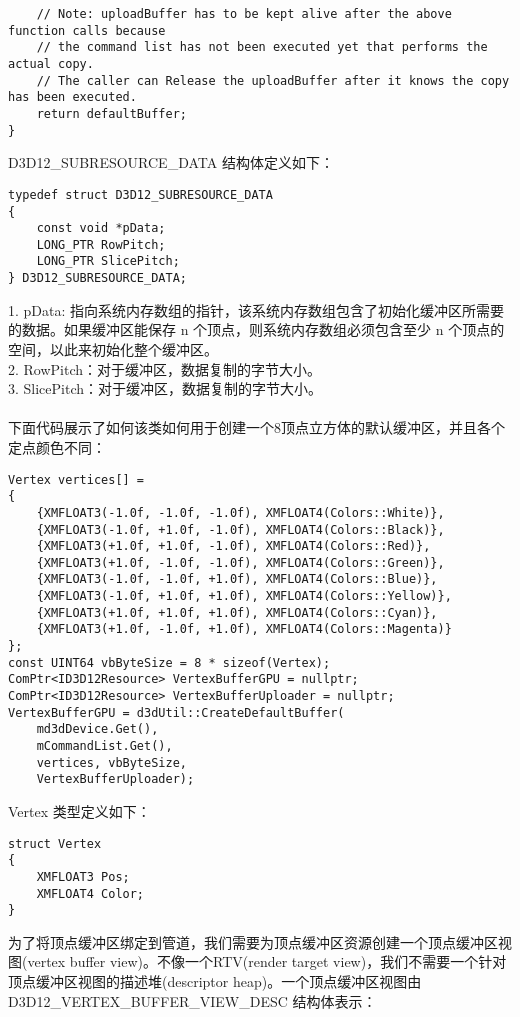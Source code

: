 \begin{flushleft}
\begin{lstlisting}
    // Note: uploadBuffer has to be kept alive after the above function calls because
    // the command list has not been executed yet that performs the actual copy.
    // The caller can Release the uploadBuffer after it knows the copy has been executed.
    return defaultBuffer;
}
\end{lstlisting}
D3D12\_SUBRESOURCE\_DATA 结构体定义如下：\\
\begin{lstlisting}
typedef struct D3D12_SUBRESOURCE_DATA
{
    const void *pData;
    LONG_PTR RowPitch;
    LONG_PTR SlicePitch;
} D3D12_SUBRESOURCE_DATA;
\end{lstlisting}
1. pData: 指向系统内存数组的指针，该系统内存数组包含了初始化缓冲区所需要的数据。如果缓冲区能保存 n 个顶点，则系统内存数组必须包含至少 n 个顶点的空间，以此来初始化整个缓冲区。\\
2. RowPitch：对于缓冲区，数据复制的字节大小。\\
3. SlicePitch：对于缓冲区，数据复制的字节大小。\\
~\\
下面代码展示了如何该类如何用于创建一个8顶点立方体的默认缓冲区，并且各个定点颜色不同：\\
\begin{lstlisting}
Vertex vertices[] = 
{
    {XMFLOAT3(-1.0f, -1.0f, -1.0f), XMFLOAT4(Colors::White)},
    {XMFLOAT3(-1.0f, +1.0f, -1.0f), XMFLOAT4(Colors::Black)},
    {XMFLOAT3(+1.0f, +1.0f, -1.0f), XMFLOAT4(Colors::Red)},
    {XMFLOAT3(+1.0f, -1.0f, -1.0f), XMFLOAT4(Colors::Green)},
    {XMFLOAT3(-1.0f, -1.0f, +1.0f), XMFLOAT4(Colors::Blue)},
    {XMFLOAT3(-1.0f, +1.0f, +1.0f), XMFLOAT4(Colors::Yellow)},
    {XMFLOAT3(+1.0f, +1.0f, +1.0f), XMFLOAT4(Colors::Cyan)},
    {XMFLOAT3(+1.0f, -1.0f, +1.0f), XMFLOAT4(Colors::Magenta)}
};
const UINT64 vbByteSize = 8 * sizeof(Vertex);
ComPtr<ID3D12Resource> VertexBufferGPU = nullptr;
ComPtr<ID3D12Resource> VertexBufferUploader = nullptr;
VertexBufferGPU = d3dUtil::CreateDefaultBuffer(
    md3dDevice.Get(),
    mCommandList.Get(),
    vertices, vbByteSize,
    VertexBufferUploader);
\end{lstlisting}
Vertex 类型定义如下：\\
\begin{lstlisting}
struct Vertex
{
    XMFLOAT3 Pos;
    XMFLOAT4 Color;
}
\end{lstlisting}
为了将顶点缓冲区绑定到管道，我们需要为顶点缓冲区资源创建一个顶点缓冲区视图(vertex buffer view)。不像一个RTV(render target view)，我们不需要一个针对顶点缓冲区视图的描述堆(descriptor heap)。一个顶点缓冲区视图由 D3D12\_VERTEX\_BUFFER\_VIEW\_DESC 结构体表示：\\

\end{flushleft}

